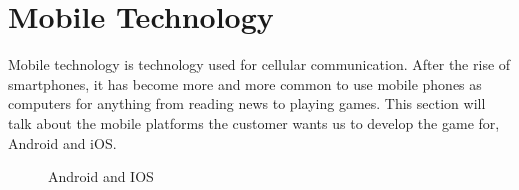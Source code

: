 \section{Mobile Technology}

Mobile technology is technology used for cellular communication. \cite{mobileTechnology} After the
rise of smartphones, it has become more and more common to use mobile phones as computers for
anything from reading news to playing games. This section will talk about the mobile platforms the
customer wants us to develop the game for, Android and iOS.

\begin{figure}[!ht]
    \centering
    \caption{Android and IOS}
\end{figure}

